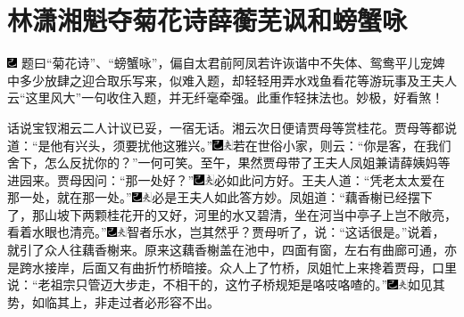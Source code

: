 

\chapter{林潇湘魁夺菊花诗\hspace{.5em}薛蘅芜讽和螃蟹咏}

{\includegraphics[width=3mm]{../Images/00003}  \kaishu 题曰``菊花诗''、``螃蟹咏''，偏自太君前阿凤若许诙谐中不失体、鸳鸯平儿宠婢中多少放肆之迎合取乐写来，似难入题，却轻轻用弄水戏鱼看花等游玩事及王夫人云``这里风大''一句收住入题，并无纤毫牵强。此重作轻抹法也。妙极，好看煞！}

话说宝钗湘云二人计议已妥，一宿无话。湘云次日便请贾母等赏桂花。贾母等都说道：``是他有兴头，须要扰他这雅兴。''{\includegraphics[width=3mm]{../Images/00003}\includegraphics[width=3mm]{../Images/00012}\footnotesize \kaishu 若在世俗小家，则云：``你是客，在我们舍下，怎么反扰你的？''一何可笑。}至午，果然贾母带了王夫人凤姐兼请薛姨妈等进园来。贾母因问：``那一处好？''{\includegraphics[width=3mm]{../Images/00003}\includegraphics[width=3mm]{../Images/00012}\footnotesize \kaishu 必如此问方好。}王夫人道：``凭老太太爱在那一处，就在那一处。''{\includegraphics[width=3mm]{../Images/00003}\includegraphics[width=3mm]{../Images/00012}\footnotesize \kaishu 必是王夫人如此答方妙。}凤姐道：``藕香榭已经摆下了，那山坡下两颗桂花开的又好，河里的水又碧清，坐在河当中亭子上岂不敞亮，看着水眼也清亮。''{\includegraphics[width=3mm]{../Images/00003}\includegraphics[width=3mm]{../Images/00012}\footnotesize \kaishu 智者乐水，岂其然乎？}贾母听了，说：``这话很是。''说着，就引了众人往藕香榭来。原来这藕香榭盖在池中，四面有窗，左右有曲廊可通，亦是跨水接岸，后面又有曲折竹桥暗接。众人上了竹桥，凤姐忙上来搀着贾母，口里说：``老祖宗只管迈大步走，不相干的，这竹子桥规矩是咯吱咯喳的。''{\includegraphics[width=3mm]{../Images/00003}\includegraphics[width=3mm]{../Images/00012}\footnotesize \kaishu 如见其势，如临其上，非走过者必形容不出。}

